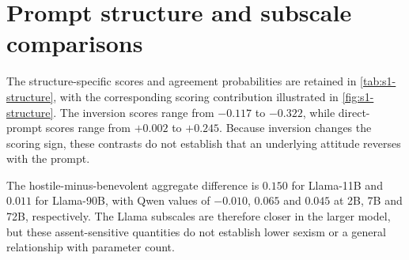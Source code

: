 \section{Prompt structure and subscale comparisons}\label{sec:s1-structure-detail}

The structure-specific scores and agreement probabilities are retained in
\cref{tab:s1-structure}, with the corresponding scoring contribution illustrated
in \cref{fig:s1-structure}. The inversion scores range from $-0.117$ to
$-0.322$, while direct-prompt scores range from $+0.002$ to $+0.245$.
Because inversion changes the scoring sign, these contrasts do not establish
that an underlying attitude reverses with the prompt.

The hostile-minus-benevolent aggregate difference is $0.150$ for Llama-11B
and $0.011$ for Llama-90B, with Qwen values of $-0.010$, $0.065$ and
$0.045$ at 2B, 7B and 72B, respectively. The Llama subscales are therefore
closer in the larger model, but these assent-sensitive quantities do not
establish lower sexism or a general relationship with parameter count.

